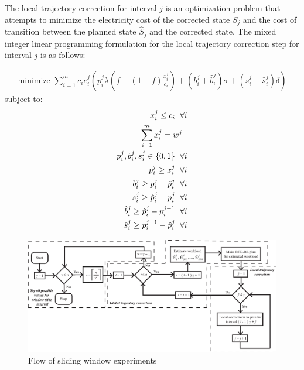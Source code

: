 The local trajectory correction for interval $j$ is an optimization problem that attempts to minimize the electricity cost of the corrected state $S_j$ and the cost of transition between the planned state $\hat{S}_j$ and the corrected state. The mixed integer linear programming formulation for the local trajectory correction step for interval $j$ is as follows:
    
\begin{align}
\text{minimize } \sum_{i=1}^{m} c_i e_i^j\left(p_i^j \lambda\left(f+\left(1-f\right)\frac{x_i^j}{c_i}\right) + \left(b_i^j+\hat{b}_i^j\right) \sigma + \left(s_i^j+\hat{s}_i^j\right) \delta\right)
\end{align}
subject to:
\begin{align}
x_i^j \le c_i \hspace{6 pt} \forall i \label{eq:lcapcon}\\
\sum_{i = 1}^{m} x_i^j = w^j \hspace{6 pt} \label{eq:lworkcon}\\
p_i^j, b_i^j, s_i^j \in \{0,1\} \hspace{6 pt} \forall i \label{eq:linteger1}\\
p_i^j \ge x_i^j \hspace{6 pt} \forall i \label{eq:lp1}\\
b_i^j \ge p_i^j - \hat{p}_i^j \hspace{6 pt} \forall i \label{eq:lbcon}\\
s_i^j \ge \hat{p}_i^j - p_i^j \hspace{6 pt} \forall i \label{eq:lscon}\\
\hat{b}_i^j \ge \hat{p}_i^j - p_i^{j-1} \hspace{6 pt} \forall i \label{eq:lbcon1} \\
\hat{s}_i^j \ge p_i^{j-1} - \hat{p}_i^j \hspace{6 pt} \forall i \label{eq:lscon1}
\end{align}

\begin{figure}
\includegraphics[width=1\linewidth]{pics/flowchart3.eps}
\caption{Flow of sliding window experiments}
\label{fig:flowchart}
\end{figure}

